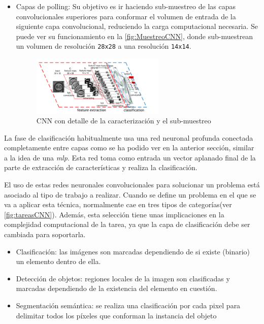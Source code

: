 \begin{itemize}
    \item Capas de polling: Su objetivo es ir haciendo sub-muestreo de las capas convolucionales superiores para conformar el volumen de entrada de la siguiente capa convolucional, reduciendo la carga computacional necesaria. 
    Se puede ver su funcionamiento en la \autoref{fig:MuestreoCNN}, donde sub-muestrean un volumen de resolución \texttt{28x28} a una resolución \texttt{14x14}.
    \begin{figure}[H]
        \centering
        \includegraphics[width=0.6\textwidth]{images/4/EjemploPolling.png}
        \caption{CNN con detalle de la caracterización y el sub-muestreo\cite{ConvolutionalNeuralNetwork}}
        \label{fig:MuestreoCNN}
    \end{figure}

\end{itemize}

La fase de clasificación habitualmente usa una red neuronal profunda conectada completamente entre capas como se ha podido ver en la anterior sección, similar a la idea de una \textit{\acrshort{mlp}}. Esta 
red toma como entrada un vector aplanado final de la parte de extracción de características y realiza la clasificación.
\clearpage


El uso de estas redes neuronales convolucionales para solucionar un problema está asociado al tipo de trabajo a realizar. Cuando se define un problema en el que se va a aplicar esta técnica, normalmente 
cae en tres tipos de categorías(ver \autoref{fig:tareasCNN}). Además, esta selección tiene unas implicaciones en la complejidad computacional de la tarea, ya que la capa de clasificación debe ser cambiada para soportarla.

\begin{itemize}
    \item Clasificación: las imágenes son marcadas dependiendo de si existe (binario) un elemento dentro de ella.
    \item Detección de objetos: regiones locales de la imagen son clasificadas y marcadas dependiendo de la existencia del elemento en cuestión.
    \item Segmentación semántica: se realiza una clasificación por cada pixel para delimitar todos los píxeles que conforman la instancia del objeto
\end{itemize}

